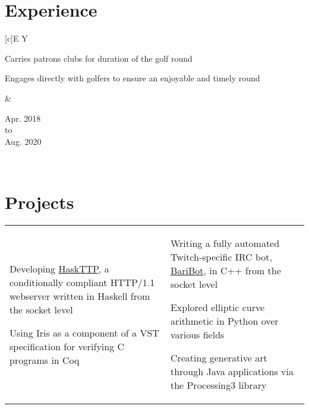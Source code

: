 \documentclass[10.5pt, letterpaper]{article}
\newenvironment{Experience} %
{                           %
	\section*{Experience}   %
	\flushleft              %
}{                          %
	\endflushleft           %
}
\newenvironment{TitleDescription}[1]                    %
{                                                       %
	\begin{description}                                 %
		\item [#1]                                      %
		\let\realitem\item                              %
		\renewcommand{\item}[1]{\let\item\realitem ##1} %
}{                                                      %
	\end{description}                                   %
}
\newenvironment{ExpEntry}[3]               %
{                                          %
	\newcommand{\DateLine}{#2 \\ to \\ #3} %
	\tabularx{\textwidth}[c]{E Y}          %
		\begin{TitleDescription}{#1}       %
}{                                         %
		\end{TitleDescription}             %
	&                                      %
	\begin{center} \DateLine \end{center}  %
	\\                                     %
	\endtabularx                           %
}
\begin{document}
\begin{Experience}
	\begin{ExpEntry}{Golf Caddie, Naperville Country Club}
		{Apr. 2018}{Aug. 2020}
		\item Carries patrons clubs for duration of the golf round
		\item Engages directly with golfers to ensure an enjoyable and timely round
	\end{ExpEntry} 
\end{Experience}

\section*{Projects}

\begin{center}
	\begin{tabularx}{\textwidth}{X X}
		\begin{TitleDescription}{Current Projects}
			\item Developing \href{https://github.com/Baricus/HaskTTP}{HaskTTP}, a conditionally compliant HTTP/1.1 webserver written in Haskell from the socket level
			\item Using Iris as a component of a VST specification for verifying C programs in Coq
		\end{TitleDescription}

		&
		\begin{TitleDescription}{Prior Projects}
			\item Writing a fully automated Twitch-specific IRC bot, \href{https://github.com/Baricus/BariBot}{BariBot}, in C++ from the socket level
			\item Explored elliptic curve arithmetic in Python over various fields
			\item Creating generative art through Java applications via the Processing3 library

		\end{TitleDescription}	
	\end{tabularx}
\end{center}
\end{document}
